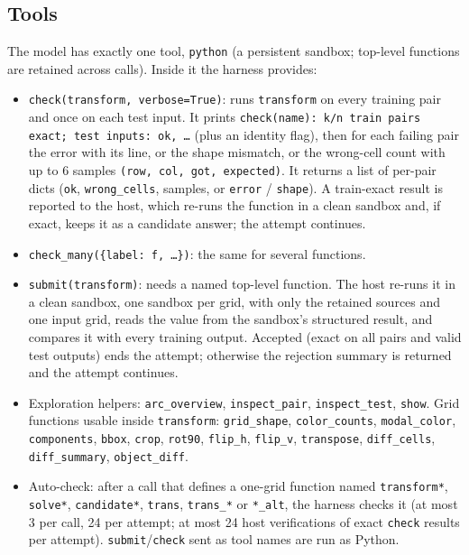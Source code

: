 \subsection{Tools}
The model has exactly one tool, \texttt{python} (a persistent sandbox; top-level functions are retained across calls). Inside it the harness provides:
\begin{itemize}[leftmargin=*,itemsep=1pt]
\item \texttt{check(transform, verbose=True)}: runs \texttt{transform} on every training pair and once on each test input. It prints \texttt{check(name): k/n train pairs exact; test inputs: ok, \dots} (plus an identity flag), then for each failing pair the error with its line, or the shape mismatch, or the wrong-cell count with up to 6 samples \texttt{(row, col, got, expected)}. It returns a list of per-pair dicts (\texttt{ok}, \texttt{wrong\_cells}, samples, or \texttt{error} / \texttt{shape}). A train-exact result is reported to the host, which re-runs the function in a clean sandbox and, if exact, keeps it as a candidate answer; the attempt continues.
\item \texttt{check\_many(\{label: f, \dots\})}: the same for several functions.
\item \texttt{submit(transform)}: needs a named top-level function. The host re-runs it in a clean sandbox, one sandbox per grid, with only the retained sources and one input grid, reads the value from the sandbox's structured result, and compares it with every training output. Accepted (exact on all pairs and valid test outputs) ends the attempt; otherwise the rejection summary is returned and the attempt continues.
\item Exploration helpers: \texttt{arc\_overview}, \texttt{inspect\_pair}, \texttt{inspect\_test}, \texttt{show}. Grid functions usable inside \texttt{transform}: \texttt{grid\_shape}, \texttt{color\_counts}, \texttt{modal\_color}, \texttt{components}, \texttt{bbox}, \texttt{crop}, \texttt{rot90}, \texttt{flip\_h}, \texttt{flip\_v}, \texttt{transpose}, \texttt{diff\_cells}, \texttt{diff\_summary}, \texttt{object\_diff}.
\item Auto-check: after a call that defines a one-grid function named \texttt{transform*}, \texttt{solve*}, \texttt{candidate*}, \texttt{trans}, \texttt{trans\_*} or \texttt{*\_alt}, the harness checks it (at most 3 per call, 24 per attempt; at most 24 host verifications of exact \texttt{check} results per attempt). \texttt{submit}/\texttt{check} sent as tool names are run as Python.
\end{itemize}

